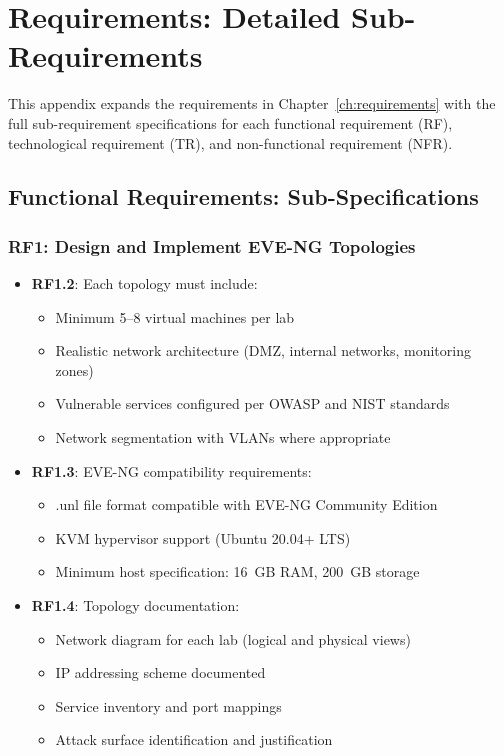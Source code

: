 
\chapter{Requirements: Detailed Sub-Requirements}
\label{app:requirements-detail}

This appendix expands the requirements in Chapter~\ref{ch:requirements} with the full
sub-requirement specifications for each functional requirement (RF), technological
requirement (TR), and non-functional requirement (NFR).

\section{Functional Requirements: Sub-Specifications}

\subsection{RF1: Design and Implement EVE-NG Topologies}

\begin{itemize}

\item \textbf{RF1.2}: Each topology must include:
\begin{itemize}
\item Minimum 5--8 virtual machines per lab
\item Realistic network architecture (DMZ, internal networks, monitoring zones)
\item Vulnerable services configured per OWASP and NIST standards
\item Network segmentation with VLANs where appropriate
\end{itemize}

\item \textbf{RF1.3}: EVE-NG compatibility requirements:
\begin{itemize}
\item .unl file format compatible with EVE-NG Community Edition
\item KVM hypervisor support (Ubuntu 20.04+ LTS)
\item Minimum host specification: 16~GB RAM, 200~GB storage
\end{itemize}

\item \textbf{RF1.4}: Topology documentation:
\begin{itemize}
\item Network diagram for each lab (logical and physical views)
\item IP addressing scheme documented
\item Service inventory and port mappings
\item Attack surface identification and justification
\end{itemize}

\end{itemize}

